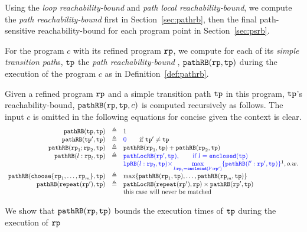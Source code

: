 Using the \emph{loop reachability-bound} and \emph{path local reachability-bound}, we compute the \emph{path reachability-bound} first in Section~\ref{sec:pathrb}, 
then the final path-sensitive reachability-bound for each program point in Section~\ref{sec:psrb}.

For the program $c$ with its refined program $\mathtt{rp}$, we compute
for each of its \emph{simple transition path}s, $\mathtt{tp}$ the \emph{path reachability-bound} , $\mathtt{pathRB}(\mathtt{rp}, \mathtt{tp})$ during the execution of the program $c$ as in Definition~\ref{def:pathrb}.
%
\begin{defn}
  \label{def:pathrb}
  Given a refined program $\mathtt{rp}$ and a simple transition path $\mathtt{tp}$ in this program, 
  $\mathtt{tp}$'s reachability-bound, $\mathtt{pathRB}(\mathtt{rp}, \mathtt{tp}, c)$
  is computed recursively as follows. 
  The input $c$ is omitted in the following equations for concise given the context is clear.
\[
  \begin{array}{rcl}
    \inoutB(\tpath, \tpath) & \triangleq & 1  \\
    \inoutB(\tpath', \tpath) & \triangleq & \highlight{0} \qquad \text{if } \tpath' \neq \tpath\\
    \inoutB(\rprog_1;\rprog_2, \tpath) & \triangleq & \inoutB(\rprog_1, \tpath) + \inoutB(\rprog_2, \tpath) \\
    \inoutB(l: \rprog_l, \tpath) & \triangleq & 
    \highlight{\outinB(\rprog', \tpath), \qquad \text{if } l = \kw{enclosed}(\tpath)}
    \\
    &  & 
    \highlight{
      \lpchB(l:\rprog_l, \tpath ) }
    \highlight{\times \max\limits_{l:\rprog_l = \kw{enclosed}(l':\rprog')}
   \{\inoutB(l':\rprog', \tpath)\} } \footnotemark, o.w. \\
    \inoutB(\rpchoose{\rprog_1, \ldots, \rprog_m }, \tpath) & \triangleq 
    & \max\left\{ \inoutB(\rprog_1, \tpath), \ldots, \inoutB(\rprog_m, \tpath) \right\} 
    \\
    \inoutB(\rprepeat(\rprog'), \tpath) & \triangleq & \outinB(\rprepeat(\rprog'), \rprog) \times \inoutB(\rprog', \tpath)\\
    &  & \text{this case will never be matched}
    \end{array}
  \]
  \end{defn}
%
We show that $\mathtt{pathRB}(\mathtt{rp}, \mathtt{tp})$ bounds the execution times of $\mathtt{tp}$ during the execution of $\mathtt{rp}$

